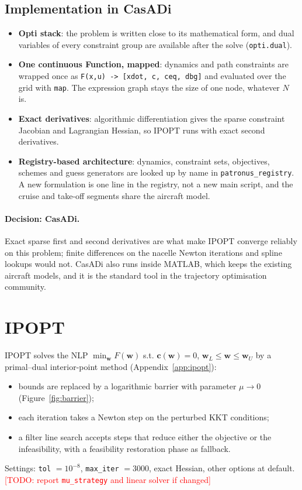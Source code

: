 \documentclass[11pt,a4paper]{article}
\newcommand{\todo}[1]{\textcolor{red}{[TODO: #1]}}
\newcommand{\code}[1]{\texttt{\small #1}}
\begin{document}
\subsection{Implementation in CasADi}
\begin{itemize}
  \item \textbf{Opti stack}: the problem is written close to its mathematical form, and dual variables of
        every constraint group are available after the solve (\code{opti.dual}).
  \item \textbf{One continuous Function, mapped}: dynamics and path constraints are wrapped once as
        \code{F(x,u) -> [xdot, c, ceq, dbg]} and evaluated over the grid with \code{map}. The expression
        graph stays the size of one node, whatever $N$ is.
  \item \textbf{Exact derivatives}: algorithmic differentiation gives the sparse constraint Jacobian and
        Lagrangian Hessian, so IPOPT runs with exact second derivatives.
  \item \textbf{Registry-based architecture}: dynamics, constraint sets, objectives, schemes and guess
        generators are looked up by name in \code{patronus\_registry}. A new formulation is one line in the
        registry, not a new main script, and the cruise and take-off segments share the aircraft model.
\end{itemize}

\paragraph{Decision: CasADi.} Exact sparse first and second derivatives are what make IPOPT converge
reliably on this problem; finite differences on the nacelle Newton iterations and spline lookups
would not. CasADi also runs inside MATLAB, which keeps the existing aircraft models, and it is
the standard tool in the trajectory optimisation community.

\section{IPOPT}\label{sec:ipopt}

IPOPT solves the NLP
$\min_{\mathbf{w}} F(\mathbf{w})$ s.t. $\mathbf{c}(\mathbf{w}) = 0$, $\mathbf{w}_L \le \mathbf{w} \le \mathbf{w}_U$
by a primal--dual interior-point method (Appendix~\ref{app:ipopt}):
\begin{itemize}
  \item bounds are replaced by a logarithmic barrier with parameter $\mu \to 0$ (Figure~\ref{fig:barrier});
  \item each iteration takes a Newton step on the perturbed KKT conditions;
  \item a filter line search accepts steps that reduce either the objective or the infeasibility,
        with a feasibility restoration phase as fallback.
\end{itemize}
Settings: \code{tol} $=10^{-8}$, \code{max\_iter} $= 3000$, exact Hessian, other options at default.
\todo{report \code{mu\_strategy} and linear solver if changed}
\end{document}
